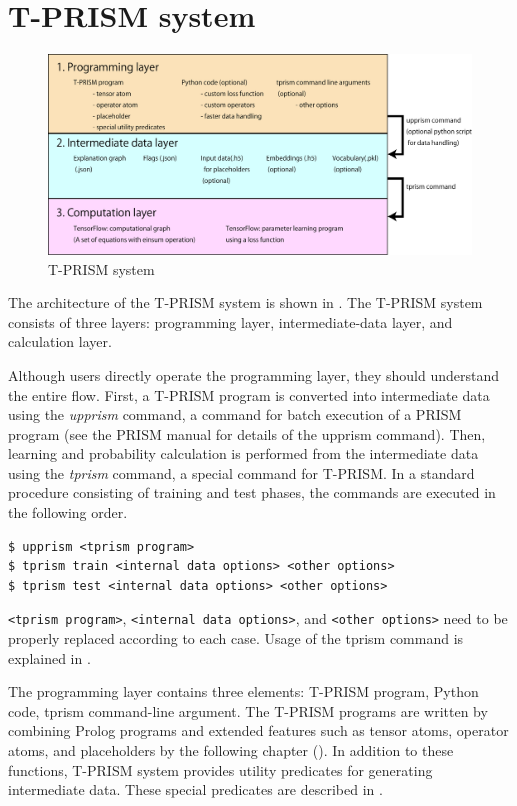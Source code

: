 \documentclass[a4paper]{report}
\begin{document}
\chapter{T-PRISM system}

\begin{figure}[tb]
	\centering
	\includegraphics[width=1.0\linewidth]{tprism_system.pdf}
	\caption[T-PRISM system]{T-PRISM system}
	\label{fig:tprismsystem}
\end{figure}


The architecture of the T-PRISM system is shown in .
The T-PRISM system consists of three layers: programming layer, intermediate-data layer, and calculation layer.

Although users directly operate the programming layer, they should understand the entire flow.
First, a T-PRISM program is converted into intermediate data using the {\it upprism} command, a command for batch execution of a PRISM program
(see the PRISM manual for details of the upprism command).
Then, learning and probability calculation is performed from the intermediate data using the {\it tprism} command, a special command for T-PRISM.
In a standard procedure consisting of training and test phases, the commands are executed in the following order.


\begin{verbatim}
$ upprism <tprism program>
$ tprism train <internal data options> <other options>
$ tprism test <internal data options> <other options>
\end{verbatim}
\verb|<tprism program>|, \verb|<internal data options>|, and \verb|<other options>| need to be properly replaced according to each case.
Usage of the tprism command is explained in .



The programming layer contains three elements: T-PRISM program, Python code, tprism command-line argument.
The T-PRISM programs are written by combining Prolog programs and extended features such as tensor atoms, operator atoms, and placeholders by the following chapter ().
In addition to these functions, T-PRISM system provides utility predicates for generating intermediate data.
These special predicates are described in .
\end{document}
